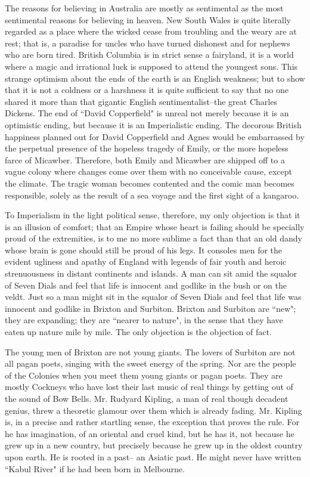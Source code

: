 \documentclass[final,10pt,letterpaper,twocolumn,openany]{book}
\begin{document}
The reasons for believing in Australia are mostly as sentimental as the
most sentimental reasons for believing in heaven. New South Wales is
quite literally regarded as a place where the wicked cease from troubling
and the weary are at rest; that is, a paradise for uncles who have turned
dishonest and for nephews who are born tired. British Columbia is in strict
sense a fairyland, it is a world where a magic and irrational luck is
supposed to attend the youngest sons. This strange optimism about the
ends of the earth is an English weakness; but to show that it is not a
coldness or a harshness it is quite sufficient to say that no one shared it
more than that gigantic English sentimentalist--the great Charles Dickens.
The end of ``David Copperfield" is unreal not merely because it is an
optimistic ending, but because it is an Imperialistic ending. The decorous
British happiness planned out for David Copperfield and Agnes would be
embarrassed by the perpetual presence of the hopeless tragedy of Emily, or
the more hopeless farce of Micawber. Therefore, both Emily and
Micawber are shipped off to a vague colony where changes come over
them with no conceivable cause, except the climate. The tragic woman
becomes contented and the comic man becomes responsible, solely as the
result of a sea voyage and the first sight of a kangaroo.

To Imperialism in the light political sense, therefore, my only
objection is that it is an illusion of comfort; that an Empire whose heart is
failing should be specially proud of the extremities, is to me no more
sublime a fact than that an old dandy whose brain is gone should still be
proud of his legs. It consoles men for the evident ugliness and apathy of
England with legends of fair youth and heroic strenuousness in distant
continents and islands. A man can sit amid the squalor of Seven Dials and
feel that life is innocent and godlike in the bush or on the veldt. Just so a
man might sit in the squalor of Seven Dials and feel that life was innocent
and godlike in Brixton and Surbiton. Brixton and Surbiton are ``new"; they
are expanding; they are ``nearer to nature", in the sense that they have
eaten up nature mile by mile. The only objection is the objection of fact.

The young men of Brixton are not young giants. The lovers of Surbiton
are not all pagan poets, singing with the sweet energy of the spring. Nor
are the people of the Colonies when you meet them young giants or pagan
poets. They are mostly Cockneys who have lost their last music of real
things by getting out of the sound of Bow Bells. Mr. Rudyard Kipling, a
man of real though decadent genius, threw a theoretic glamour over them
which is already fading. Mr. Kipling is, in a precise and rather startling
sense, the exception that proves the rule. For he has imagination, of an
oriental and cruel kind, but he has it, not because he grew up in a new
country, but precisely because he grew up in the oldest country upon earth.
He is rooted in a past-- an Asiatic past. He might never have written
``Kabul River" if he had been born in Melbourne.
\end{document}
